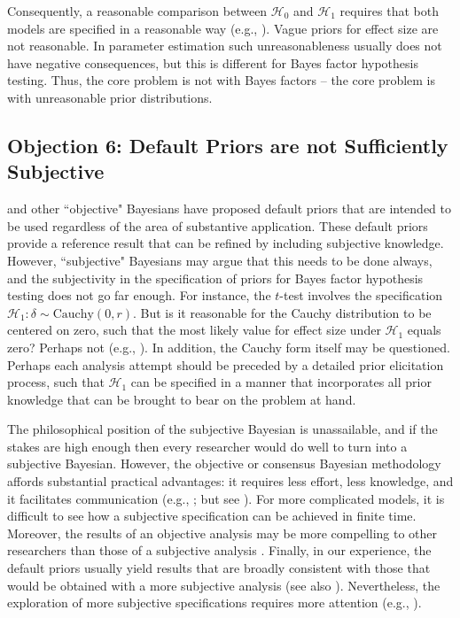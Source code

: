 Consequently, a reasonable comparison between $\mathcal{H}_0$ and $\mathcal{H}_1$ requires that both models are specified in a reasonable way (e.g., ). Vague priors for effect size are not reasonable. In parameter estimation such unreasonableness usually does not have negative consequences, but this is different for Bayes factor hypothesis testing. Thus, the core problem is not with Bayes factors -- the core problem is with unreasonable prior distributions.

\subsection{Objection 6: Default Priors are not Sufficiently Subjective}
 and other ``objective" Bayesians have proposed default priors that are intended to be used regardless of the area of substantive application. These default priors provide a reference result that can be refined by including subjective knowledge. However, ``subjective" Bayesians may argue that this needs to be done always, and the subjectivity in the specification of priors for Bayes factor hypothesis testing does not go far enough. For instance, the $t$-test involves the specification $\mathcal{H}_1: \delta \sim \text{Cauchy}(0,r)$. But is it reasonable for the Cauchy distribution to be centered on zero, such that the most likely value for effect size under $\mathcal{H}_1$ equals zero? Perhaps not (e.g., ). In addition, the Cauchy form itself may be questioned. Perhaps each analysis attempt should be preceded by a detailed prior elicitation process, such that $\mathcal{H}_1$ can be specified in a manner that incorporates all prior knowledge that can be brought to bear on the problem at hand.

The philosophical position of the subjective Bayesian is unassailable, and if the stakes are high enough then every researcher would do well to turn into a subjective Bayesian. However, the objective or consensus Bayesian methodology affords substantial practical advantages: it requires less effort, less knowledge, and it facilitates communication (e.g., ; but see ). For more complicated models, it is difficult to see how a subjective specification can be achieved in finite time. Moreover, the results of an objective analysis may be more compelling to other researchers than those of a subjective analysis \cite{MoreyEtAlinpressHH}. Finally, in our experience, the default priors usually yield results that are broadly consistent with those that would be obtained with a more subjective analysis (see also ). Nevertheless, the exploration of more subjective specifications requires more attention (e.g., ).

